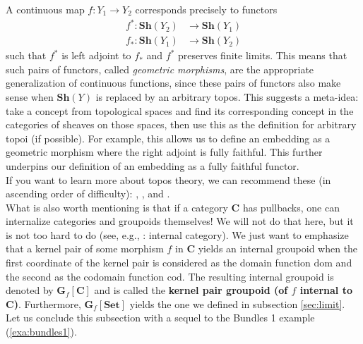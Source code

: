 A continuous map $f \colon Y_{1} \rightarrow Y_{2}$ corresponds precisely to functors
\begin{align*}
  f^{\ast}
  \colon
  \mathbf{Sh}(Y_{2})
  &\rightarrow
  \mathbf{Sh}(Y_{1})
  \\
  f_{\ast}
  \colon
  \mathbf{Sh}(Y_{1})
  &\rightarrow
  \mathbf{Sh}(Y_{2})
\end{align*}
such that $f^{\ast}$ is left adjoint to $f_{\ast}$ and $f^{\ast}$ preserves finite limits.
This means that such pairs of functors, called \textit{geometric morphisms}, are the appropriate generalization of continuous functions, since these pairs of functors also make sense when $\mathbf{Sh}(Y)$ is replaced by an arbitrary topos.
This suggests a meta-idea: take a concept from topological spaces and find its corresponding concept in the categories of sheaves on those spaces, then use this as the definition for arbitrary topoi (if possible).
For example, this allows us to define an embedding as a geometric morphism where the right adjoint is fully faithful.
This further underpins our definition of an embedding as a fully faithful functor.
\\
If you want to learn more about topos theory, we can recommend these (in ascending order of difficulty): \cite{de9b9402}, \cite{c55c71e8}, and \cite{c1f00dad}.
\\
What is also worth mentioning is that if a category $\mathbf{C}$ has pullbacks, one can internalize categories and groupoids themselves!
We will not do that here, but it is not too hard to do (see, e.g., \cite{wiki-nlab0000}: internal category).
We just want to emphasize that a kernel pair of some morphism $f$ in $\mathbf{C}$ yields an internal groupoid when the first coordinate of the kernel pair is considered as the domain function $\mathrm{dom}$ and the second as the codomain function $\mathrm{cod}$.
The resulting internal groupoid is denoted by $\mathbf{G}_{f}[\mathbf{C}]$ and is called the \textbf{kernel pair groupoid (of $f$ internal to $\mathbf{C}$)}. 
Furthermore, $\mathbf{G}_{f}[\mathbf{Set}]$ yields the one we defined in subsection \ref{sec:limit}.
\\
Let us conclude this subsection with a sequel to the Bundles 1 example (\ref{exa:bundles1}).
\\
